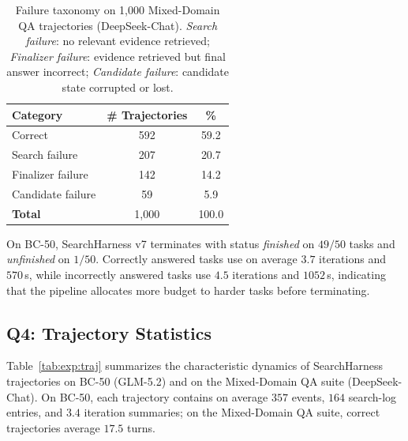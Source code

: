 \begin{table}[t]
  \centering
  \small
  \begin{tabular}{lcc}
    \toprule
    Category & \# Trajectories & \% \\
    \midrule
    Correct             & 592 & 59.2 \\
    Search failure      & 207 & 20.7 \\
    Finalizer failure   & 142 & 14.2 \\
    Candidate failure   &  59 &  5.9 \\
    \midrule
    \textbf{Total}      & 1{,}000 & 100.0 \\
    \bottomrule
  \end{tabular}
  \caption{Failure taxonomy on 1{,}000 Mixed-Domain QA trajectories (DeepSeek-Chat). \emph{Search failure}: no relevant evidence retrieved; \emph{Finalizer failure}: evidence retrieved but final answer incorrect; \emph{Candidate failure}: candidate state corrupted or lost.}
  \label{tab:exp:failure}
\end{table}

On BC-50, SearchHarness v7 terminates with status \emph{finished} on $49/50$ tasks and \emph{unfinished} on $1/50$.
Correctly answered tasks use on average $3.7$ iterations and $570$\,s, while incorrectly answered tasks use $4.5$ iterations and $1052$\,s, indicating that the pipeline allocates more budget to harder tasks before terminating.

\subsection{Q4: Trajectory Statistics}
\label{sec:exp:traj}

Table~\ref{tab:exp:traj} summarizes the characteristic dynamics of SearchHarness trajectories on BC-50 (GLM-5.2) and on the Mixed-Domain QA suite (DeepSeek-Chat).
On BC-50, each trajectory contains on average $357$ events, $164$ search-log entries, and $3.4$ iteration summaries; on the Mixed-Domain QA suite, correct trajectories average $17.5$ turns.

